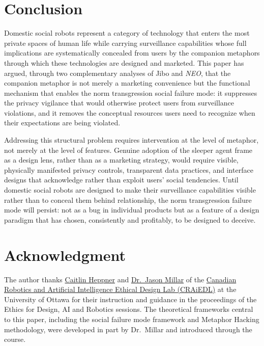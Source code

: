 \documentclass{ieee-portfolio}
\newcommand{\neo}{\textit{NEO}}
\begin{document}
\section{Conclusion}
\label{sec:conclusion}

Domestic social robots represent a category of technology that enters the most private spaces of human life while carrying surveillance capabilities whose full implications are systematically concealed from users by the companion metaphors through which these technologies are designed and marketed. This paper has argued, through two complementary analyses of Jibo and \neo{}, that the companion metaphor is not merely a marketing convenience but the functional mechanism that enables the norm transgression social failure mode: it suppresses the privacy vigilance that would otherwise protect users from surveillance violations, and it removes the conceptual resources users need to recognize when their expectations are being violated.

Addressing this structural problem requires intervention at the level of metaphor, not merely at the level of features. Genuine adoption of the sleeper agent frame as a design lens, rather than as a marketing strategy, would require visible, physically manifested privacy controls, transparent data practices, and interface designs that acknowledge rather than exploit users' social tendencies. Until domestic social robots are designed to make their surveillance capabilities visible rather than to conceal them behind relationship, the norm transgression failure mode will persist: not as a bug in individual products but as a feature of a design paradigm that has chosen, consistently and profitably, to be designed to deceive.

\section*{Acknowledgment}
The author thanks \href{https://craiedl.ca/team/caitlin-heppner}{Caitlin Heppner} and \href{https://craiedl.ca/team/jason-millar}{Dr.\ Jason Millar} of the \href{https://craiedl.ca}{Canadian Robotics and Artificial Intelligence Ethical Design Lab (CRAiEDL)} at the University of Ottawa for their instruction and guidance in the proceedings of the Ethics for Design, AI and Robotics sessions. The theoretical frameworks central to this paper, including the social failure mode framework and Metaphor Hacking methodology, were developed in part by Dr.\ Millar and introduced through the course.

\glsaddall
\printglossary[type=\acronymtype,title=List of Acronyms]



\end{document}
